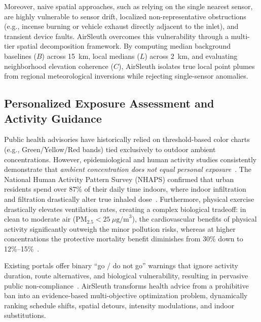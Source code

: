 \documentclass[conference]{IEEEtran}
\begin{document}
Moreover, naive spatial approaches, such as relying on the single nearest sensor, are highly vulnerable to sensor drift, localized non-representative obstructions (e.g., incense burning or vehicle exhaust directly adjacent to the inlet), and transient device faults. AirSleuth overcomes this vulnerability through a multi-tier spatial decomposition framework. By computing median background baselines ($B$) across 15~km, local medians ($L$) across 2~km, and evaluating neighborhood elevation coherence ($C$), AirSleuth isolates true local point plumes from regional meteorological inversions while rejecting single-sensor anomalies.

\subsection{Personalized Exposure Assessment and Activity Guidance}
Public health advisories have historically relied on threshold-based color charts (e.g., Green/Yellow/Red bands) tied exclusively to outdoor ambient concentrations. However, epidemiological and human activity studies consistently demonstrate that \textit{ambient concentration does not equal personal exposure}~\cite{s_034}. The National Human Activity Pattern Survey (NHAPS) confirmed that urban residents spend over 87\% of their daily time indoors, where indoor infiltration and filtration drastically alter true inhaled dose~\cite{s_034}. Furthermore, physical exercise drastically elevates ventilation rates, creating a complex biological tradeoff: in clean to moderate air ($\text{PM}_{2.5} < 25~\mu\text{g/m}^3$), the cardiovascular benefits of physical activity significantly outweigh the minor pollution risks, whereas at higher concentrations the protective mortality benefit diminishes from 30\% down to 12\%--15\%~\cite{s_033, s_061}.

Existing portals offer binary ``go / do not go'' warnings that ignore activity duration, route alternatives, and biological vulnerability, resulting in pervasive public non-compliance~\cite{s_028}. AirSleuth transforms health advice from a prohibitive ban into an evidence-based multi-objective optimization problem, dynamically ranking schedule shifts, spatial detours, intensity modulations, and indoor substitutions.
\end{document}
